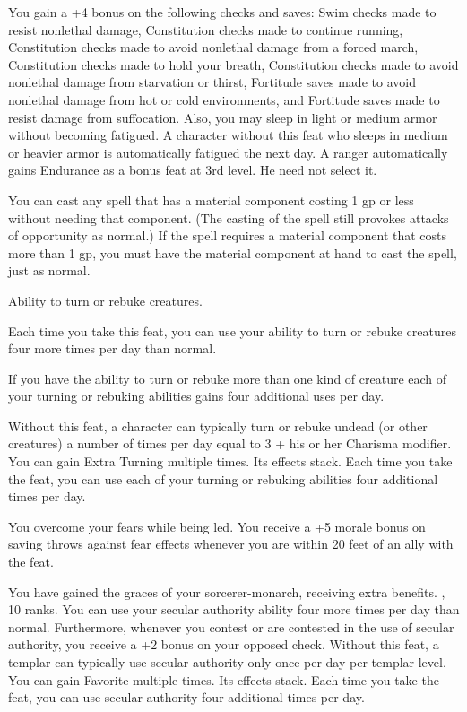 {}
{You gain a +4 bonus on the following checks and saves: Swim checks made to resist nonlethal damage, Constitution checks made to continue running, Constitution checks made to avoid nonlethal damage from a forced march, Constitution checks made to hold your breath, Constitution checks made to avoid nonlethal damage from starvation or thirst, Fortitude saves made to avoid nonlethal damage from hot or cold environments, and Fortitude saves made to resist damage from suffocation. Also, you may sleep in light or medium armor without becoming fatigued.}
{A character without this feat who sleeps in medium or heavier armor is automatically fatigued the next day.}{}
{A ranger automatically gains Endurance as a bonus feat at 3rd level. He need not select it.}

{You can cast any spell that has a material component costing 1 gp or less without needing that component. (The casting of the spell still provokes attacks of opportunity as normal.) If the spell requires a material component that costs more than 1 gp, you must have the material component at hand to cast the spell, just as normal.}

{}
{Ability to turn or rebuke creatures.}
{Each time you take this feat, you can use your ability to turn or rebuke creatures four more times per day than normal.

If you have the ability to turn or rebuke more than one kind of creature each of your turning or rebuking abilities gains four additional uses per day.}
{Without this feat, a character can typically turn or rebuke undead (or other creatures) a number of times per day equal to 3 + his or her Charisma modifier.}
{You can gain Extra Turning multiple times. Its effects stack. Each time you take the feat, you can use each of your turning or rebuking abilities four additional times per day.}

{You overcome your fears while being led.}{}
{You receive a +5 morale bonus on saving throws against fear effects whenever you are within 20 feet of an ally with the  feat.}{}{}

{You have gained the graces of your sorcerer-monarch, receiving extra benefits.}
{,  10 ranks.}
{You can use your secular authority ability four more times per day than normal. Furthermore, whenever you contest or are contested in the use of secular authority, you receive a +2 bonus on your opposed  check.}
{Without this feat, a templar can typically use secular authority only once per day per templar level.}
{You can gain Favorite multiple times. Its effects stack. Each time you take the feat, you can use secular authority four additional times per day.}

